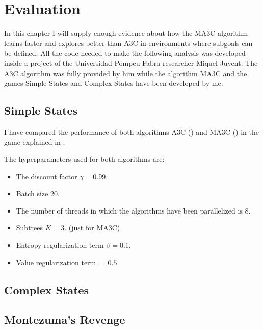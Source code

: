 \chapter{Evaluation}

In this chapter I will supply enough evidence about how the \ac{MA3C} algorithm learns faster and explores better than
\ac{A3C} in environments where subgoals can be defined.
All the code needed to make the following analysis was developed inside a project of the Universidad Pompeu Fabra researcher
Miquel Juyent.
The \ac{A3C} algorithm was fully provided by him while the algorithm \ac{MA3C} and the games Simple States and Complex
States have been developed by me.

\section{Simple States}

I have compared the performance of both algorithms \ac{A3C} () and \ac{MA3C} () in the game
explained in .

The hyperparameters used for both algorithms are:
\begin{itemize}
    \item The discount factor $\gamma = 0.99$.
    \item Batch size $20$. %
    \item The number of threads in which the algorithms have been parallelized is $8$.
    \item Subtrees $K = 3$. (just for \ac{MA3C})
    \item Entropy regularization term $\beta = 0.1$.
    \item Value regularization term $ = 0.5$ %
\end{itemize}

\section{Complex States}

\section{Montezuma's Revenge}

